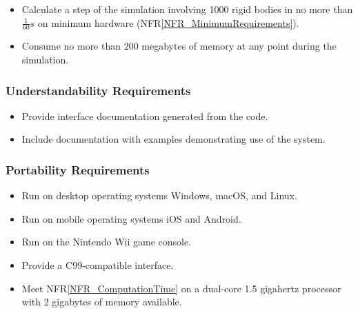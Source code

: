 \documentclass[12pt]{article}
\newcounter{nfrnum} %
\newcommand{\nfrref}[1]{NFR\ref{#1}}
\begin{document}
\begin{itemize}
\item[NFR\refstepcounter{nfrnum}\thenfrnum \label{NFR_ComputationTime}:] Calculate a step of the simulation involving 1000 rigid bodies in no more than $\frac{1}{60}s$ on minimum hardware (\nfrref{NFR_MinimumRequirements}).
\item[NFR\refstepcounter{nfrnum}\thenfrnum \label{NFR_ComputationMemory}:] Consume no more than 200 megabytes of memory at any point during the simulation.
\end{itemize}

\subsubsection{Understandability Requirements}

\begin{itemize}
\item[NFR\refstepcounter{nfrnum}\thenfrnum \label{NFR_APIDocumentation}:] Provide interface documentation generated from the code.
\item[NFR\refstepcounter{nfrnum}\thenfrnum \label{NFR_Examples}:] Include documentation with examples demonstrating use of the system.
\end{itemize}

\subsubsection{Portability Requirements}

\begin{itemize}
\item[NFR\refstepcounter{nfrnum}\thenfrnum \label{NFR_DesktopOS}:] Run on desktop operating systems Windows, macOS, and Linux.
\item[NFR\refstepcounter{nfrnum}\thenfrnum \label{NFR_MobileOS}:] Run on mobile operating systems iOS and Android.
\item[NFR\refstepcounter{nfrnum}\thenfrnum \label{NFR_GameConsoles}:] Run on the Nintendo Wii game console.
\item[NFR\refstepcounter{nfrnum}\thenfrnum \label{NFR_LanguageCompatibility}:] Provide a C99-compatible\cite{C99ISO} interface.
\item[NFR\refstepcounter{nfrnum}\thenfrnum \label{NFR_MinimumRequirements}:] Meet \nfrref{NFR_ComputationTime} on a dual-core 1.5 gigahertz processor with 2 gigabytes of memory available.
\end{itemize}
\end{document}
